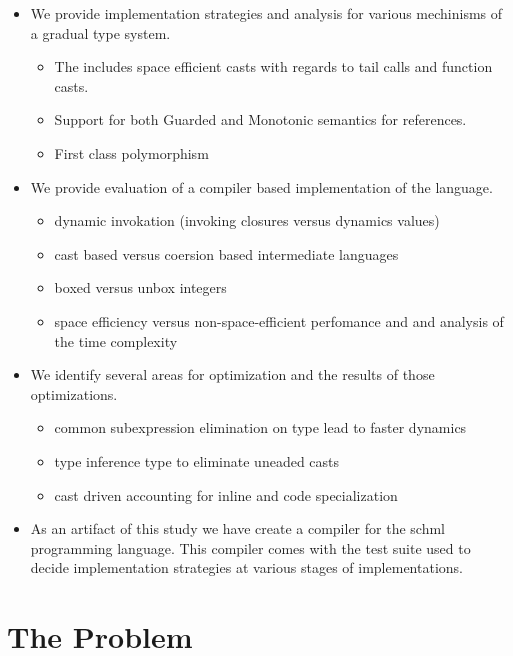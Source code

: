 \documentclass{article}
\begin{document}
\begin{itemize}
\item We provide implementation strategies and analysis for various mechinisms of
  a gradual type system.
  \begin{itemize}
  \item The includes space efficient casts with regards
    to tail calls and function casts.
  \item Support for both Guarded and Monotonic semantics for references.
  \item First class polymorphism
  \end{itemize}
  \item We provide evaluation of a compiler based implementation
  of the language.
  \begin{itemize}
    \item dynamic invokation (invoking closures versus dynamics values)
    \item cast based versus coersion based intermediate languages
    \item boxed versus unbox integers
    \item space efficiency versus non-space-efficient perfomance and
    and analysis of the time complexity
  \end{itemize}
\item We identify several areas for optimization and the results of those optimizations.
  \begin{itemize}
    \item common subexpression elimination on type lead to faster dynamics
    \item type inference type to eliminate uneaded casts 
    \item cast driven accounting for inline and code specialization
  \end{itemize}
\item As an artifact of this study we have create a compiler for the schml programming
  language. This compiler comes with the test suite used to decide implementation
  strategies at various stages of implementations.
\end{itemize}



\section{The Problem}  %

\end{document}
